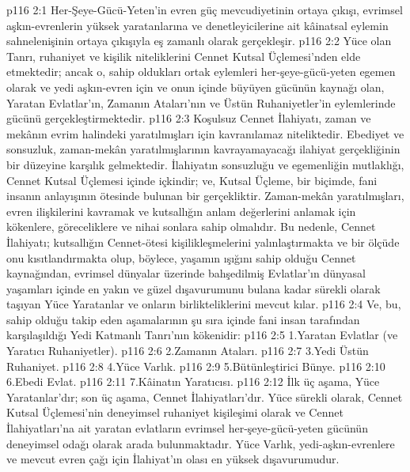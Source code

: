 \vs p116 2:1 Her\hyp{}Şeye\hyp{}Gücü\hyp{}Yeten’in evren güç mevcudiyetinin ortaya çıkışı, evrimsel aşkın\hyp{}evrenlerin yüksek yaratanlarına ve denetleyicilerine ait kâinatsal eylemin sahnelenişinin ortaya çıkışıyla eş zamanlı olarak gerçekleşir.
\vs p116 2:2 Yüce olan Tanrı, ruhaniyet ve kişilik niteliklerini Cennet Kutsal Üçlemesi’nden elde etmektedir; ancak o, sahip oldukları ortak eylemleri her\hyp{}şeye\hyp{}gücü\hyp{}yeten egemen olarak ve yedi aşkın\hyp{}evren için ve onun içinde büyüyen gücünün kaynağı olan, Yaratan Evlatlar’ın, Zamanın Ataları’nın ve Üstün Ruhaniyetler’in eylemlerinde gücünü gerçekleştirmektedir.
\vs p116 2:3 Koşulsuz Cennet İlahiyatı, zaman ve mekânın evrim halindeki yaratılmışları için kavranılamaz niteliktedir. Ebediyet ve sonsuzluk, zaman\hyp{}mekân yaratılmışlarının kavrayamayacağı ilahiyat gerçekliğinin bir düzeyine karşılık gelmektedir. İlahiyatın sonsuzluğu ve egemenliğin mutlaklığı, Cennet Kutsal Üçlemesi içinde içkindir; ve, Kutsal Üçleme, bir biçimde, fani insanın anlayışının ötesinde bulunan bir gerçekliktir. Zaman\hyp{}mekân yaratılmışları, evren ilişkilerini kavramak ve kutsallığın anlam değerlerini anlamak için kökenlere, göreceliklere ve nihai sonlara sahip olmalıdır. Bu nedenle, Cennet İlahiyatı; kutsallığın Cennet\hyp{}ötesi kişilikleşmelerini yalınlaştırmakta ve bir ölçüde onu kısıtlandırmakta olup, böylece, yaşamın ışığını sahip olduğu Cennet kaynağından, evrimsel dünyalar üzerinde bahşedilmiş Evlatlar’ın dünyasal yaşamları içinde en yakın ve güzel dışavurumunu bulana kadar sürekli olarak taşıyan Yüce Yaratanlar ve onların birlikteliklerini mevcut kılar.
\vs p116 2:4 Ve, bu, sahip olduğu takip eden aşamalarının şu sıra içinde fani insan tarafından karşılaşıldığı Yedi Katmanlı Tanrı’nın kökenidir:
\vs p116 2:5 1.\bibnobreakspace Yaratan Evlatlar (ve Yaratıcı Ruhaniyetler).
\vs p116 2:6 2.\bibnobreakspace Zamanın Ataları.
\vs p116 2:7 3.\bibnobreakspace Yedi Üstün Ruhaniyet.
\vs p116 2:8 4.\bibnobreakspace Yüce Varlık.
\vs p116 2:9 5.\bibnobreakspace Bütünleştirici Bünye.
\vs p116 2:10 6.\bibnobreakspace Ebedi Evlat.
\vs p116 2:11 7.\bibnobreakspace Kâinatın Yaratıcısı.
\vs p116 2:12 İlk üç aşama, Yüce Yaratanlar’dır; son üç aşama, Cennet İlahiyatları’dır. Yüce sürekli olarak, Cennet Kutsal Üçlemesi’nin deneyimsel ruhaniyet kişileşimi olarak ve Cennet İlahiyatları’na ait yaratan evlatların evrimsel her\hyp{}şeye\hyp{}gücü\hyp{}yeten gücünün deneyimsel odağı olarak arada bulunmaktadır. Yüce Varlık, yedi\hyp{}aşkın\hyp{}evrenlere ve mevcut evren çağı için İlahiyat’ın olası en yüksek dışavurumudur.
